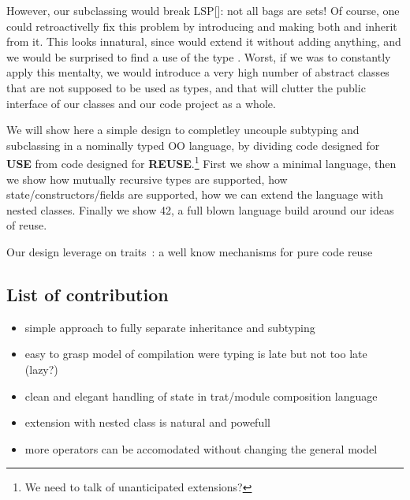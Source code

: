 However, our subclassing would break LSP[]: not all bags are sets!
Of course, one could retroactivelly fix this problem by introducing \Q@AbstractSetOrBag@
and making both \Q@Bag@ and \Q@Set@ inherit from it.
This looks innatural, since \Q@Set@ would extend it without adding anything,
and we would be surprised to find a use of the type \Q@AbstractSetOrBag@.
Worst, if we was to constantly apply this mentalty, we would introduce a very high number
of abstract classes that are not supposed to be used as types, and that will clutter the 
public interface of our classes and our code project as a whole.

We will show here a simple design to completley uncouple subtyping
and subclassing in a nominally typed OO language,
by dividing code designed for \textbf{USE}
from code designed for \textbf{REUSE}.\footnote{We need to talk of unanticipated extensions?}
First we show a minimal language, then we show how mutually recursive types
are supported, how state/constructors/fields are supported,
how we can extend the language with nested classes.
Finally we show 42, a full blown language build around our ideas of reuse.

Our design leverage on traits~\cite{}: a well know mechanisms for pure
code reuse


\subsection{List of contribution}
\begin{itemize}
\item simple approach to fully separate inheritance and subtyping
\item easy to grasp model of compilation were typing is late but not too late (lazy?)
\item clean and elegant handling of state in trat/module composition language
\item extension with nested class is natural and powefull
\item more operators can be accomodated without changing the general model
\end{itemize}

